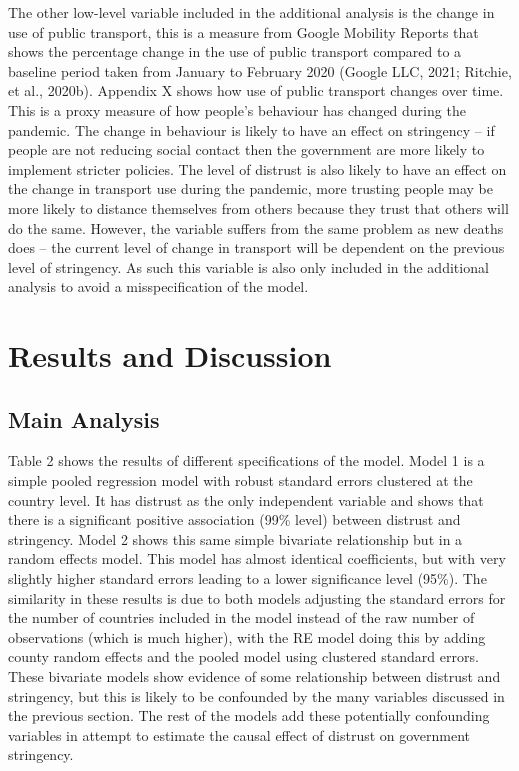 \documentclass[
  11pt,
]{article}
\begin{document}
The other low-level variable included in the additional analysis is the change in use of public transport, this is a measure from Google Mobility Reports that shows the percentage change in the use of public transport compared to a baseline period taken from January to February 2020 (Google LLC, 2021; Ritchie, et al., 2020b). Appendix X shows how use of public transport changes over time. This is a proxy measure of how people's behaviour has changed during the pandemic. The change in behaviour is likely to have an effect on stringency -- if people are not reducing social contact then the government are more likely to implement stricter policies. The level of distrust is also likely to have an effect on the change in transport use during the pandemic, more trusting people may be more likely to distance themselves from others because they trust that others will do the same. However, the variable suffers from the same problem as new deaths does -- the current level of change in transport will be dependent on the previous level of stringency. As such this variable is also only included in the additional analysis to avoid a misspecification of the model.\\

\hypertarget{results-and-discussion}{%
\section{Results and Discussion}\label{results-and-discussion}}

\hypertarget{main-analysis}{%
\subsection{Main Analysis}\label{main-analysis}}

Table 2 shows the results of different specifications of the model. Model 1 is a simple pooled regression model with robust standard errors clustered at the country level. It has distrust as the only independent variable and shows that there is a significant positive association (99\% level) between distrust and stringency. Model 2 shows this same simple bivariate relationship but in a random effects model. This model has almost identical coefficients, but with very slightly higher standard errors leading to a lower significance level (95\%). The similarity in these results is due to both models adjusting the standard errors for the number of countries included in the model instead of the raw number of observations (which is much higher), with the RE model doing this by adding county random effects and the pooled model using clustered standard errors. These bivariate models show evidence of some relationship between distrust and stringency, but this is likely to be confounded by the many variables discussed in the previous section. The rest of the models add these potentially confounding variables in attempt to estimate the causal effect of distrust on government stringency.\\
~\\
\end{document}
